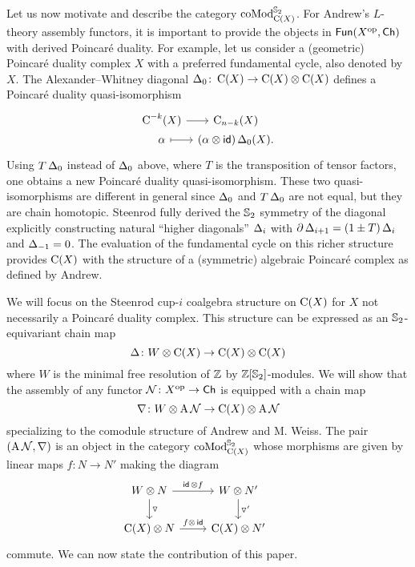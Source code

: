 Let us now motivate and describe the category $\operatorname{coMod}^{\mathbb{S}_2}_{\operatorname{C}(X)}$.
For Andrew's $L$-theory assembly functors, it is important to provide the objects in $\mathsf{Fun}(X^{\mathrm{op}}, \mathsf{Ch})$ with derived Poincar\'e duality.
For example, let us consider a (geometric) Poincar\'e duality complex $X$ with a preferred fundamental cycle, also denoted by $X$.
The Alexander--Whitney diagonal $\operatorname{\Delta}_0 \colon \operatorname{C}(X) \to \operatorname{C}(X) \otimes \operatorname{C}(X)$ defines a Poincar\'e duality quasi-isomorphism
\[
\begin{tikzcd}[column sep=tiny,row sep=0]
	\cochains^{-k}(X) \arrow[r] & \chains_{n-k}(X) \\
	\alpha \arrow[r,mapsto] & (\alpha \ot \id)\copr_0(X).
\end{tikzcd}
\]
Using $T\operatorname{\Delta}_0$ instead of $\operatorname{\Delta}_0$ above, where $T$ is the transposition of tensor factors, one obtains a new Poincar\'e duality quasi-isomorphism.
These two quasi-isomorphisms are different in general since $\operatorname{\Delta}_0$ and $T\operatorname{\Delta}_0$ are not equal, but they are chain homotopic.
Steenrod \cite{steenrod1947products} fully derived the $\mathbb{S}_2$ symmetry of the diagonal explicitly constructing natural ``higher diagonals'' $\operatorname{\Delta}_i$ with $\partial \operatorname{\Delta}_{i+1} = (1 \pm T) \operatorname{\Delta}_i$ and $\operatorname{\Delta}_{-1} = 0$.
The evaluation of the fundamental cycle on this richer structure provides $\operatorname{C}(X)$ with the structure of a (symmetric) algebraic Poincar\'e complex as defined by Andrew.

We will focus on the Steenrod cup-$i$ coalgebra structure on $\operatorname{C}(X)$ for $X$ not necessarily a Poincar\'e duality complex.
This structure can be expressed as an $\mathbb{S}_2$-equivariant chain map
\[
\operatorname{\Delta} \colon W \otimes \operatorname{C}(X) \to \operatorname{C}(X) \otimes \operatorname{C}(X)
\]
where $W$ is the minimal free resolution of $\mathbb{Z}$ by $\mathbb{Z}[\mathbb{S}_2]$-modules.
We will show that the assembly of any functor $\mathcal{N} \colon X^{\mathrm{op}} \to \mathsf{Ch}$ is equipped with a chain map
\[
\nabla \colon W \otimes \operatorname{A} \mathcal{N} \to \operatorname{C}(X) \otimes \operatorname{A} \mathcal{N}
\]
specializing to the comodule structure of Andrew and M. Weiss.
The pair $(\operatorname{A} \mathcal{N}, \nabla)$ is an object in the category $\operatorname{coMod}^{\mathbb{S}_2}_{\operatorname{C}(X)}$ whose morphisms are given by linear maps $f \colon N \to N'$ making the diagram
\[
\begin{tikzcd}
	W \ot N \arrow[d, "\triangledown"] \arrow[r, "\id\, \ot f"] &
	W \ot N' \arrow[d, "\triangledown'"] & \\
	\chains(X) \ot N \arrow[r, "f \ot\, \id"] &
	\chains(X) \ot N'
\end{tikzcd}
\]
commute.
We can now state the contribution of this paper.

